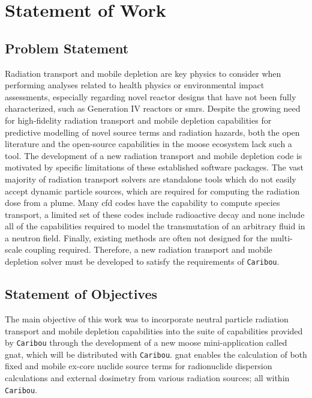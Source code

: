 \chapter{Statement of Work} 
\label{statement_of_work}
\section{Problem Statement}
\label{statement_of_work:ps}

Radiation transport and mobile depletion are key physics to consider when performing analyses related to health physics or environmental impact assessments, especially regarding novel reactor designs that have not been fully characterized, such as Generation IV reactors or \acrshort{smrs}. Despite the growing need for high-fidelity radiation transport and mobile depletion capabilities for predictive modelling of novel source terms and radiation hazards, both the open literature and the open-source capabilities in the \acrshort{moose} ecosystem lack such a tool.
The development of a new radiation transport and mobile depletion code is motivated by specific limitations of these established software packages. The vast majority of radiation transport solvers are standalone tools which do not easily accept dynamic particle sources, which are required for computing the radiation dose from a plume. Many \acrshort{cfd} codes have the capability to compute species transport, a limited set of these codes include radioactive decay and none include all of the capabilities required to model the transmutation of an arbitrary fluid in a neutron field. Finally, existing methods are often not designed for the multi-scale coupling required. Therefore, a new radiation transport and mobile depletion solver must be developed to satisfy the requirements of \texttt{Caribou}.

\section{Statement of Objectives}
\label{statement_of_work:so}
The main objective of this work was to incorporate neutral particle radiation transport and mobile depletion capabilities into the suite of capabilities provided by \texttt{Caribou} through the development of a new \acrshort{moose} mini-application called \acrshort{gnat}, which will be distributed with \texttt{Caribou}. \acrshort{gnat} enables the calculation of both fixed and mobile ex-core nuclide source terms for radionuclide dispersion calculations and external dosimetry from various radiation sources; all within \texttt{Caribou}.

